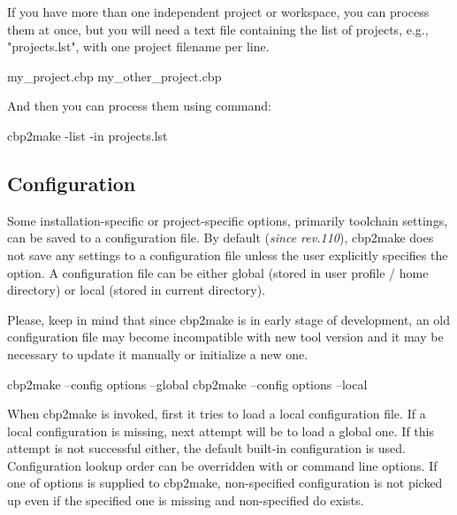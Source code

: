 If you have more than one independent project or workspace, you can process them at once, but you will need a text file containing the list of projects, e.g., "projects.lst", with one project filename per line.

\begin{code}
    my_project.cbp
    my_other_project.cbp 
\end{code}

And then you can process them using command:
\begin{code}
cbp2make -list -in projects.lst
\end{code}

\subsection{Configuration}

Some installation-specific or project-specific options, primarily toolchain settings, can be saved to a configuration file. By default (\textit{since rev.110}), cbp2make does not save any settings to a configuration file unless the user explicitly specifies the  option. A configuration file can be either global (stored in user profile / home directory) or local (stored in current directory).

Please, keep in mind that since cbp2make is in early stage of development, an old configuration file may become incompatible with new tool version and it may be necessary to update it manually or initialize a new one.


\begin{code}
cbp2make --config options --global
cbp2make --config options --local
\end{code}


When cbp2make is invoked, first it tries to load a local configuration file. If a local configuration is missing, next attempt will be to load a global one. If this attempt is not successful either, the default built-in configuration is used. Configuration lookup order can be overridden with  or  command line options. If one of options is supplied to cbp2make, non-specified configuration is not picked up even if the specified one is missing and non-specified do exists.


